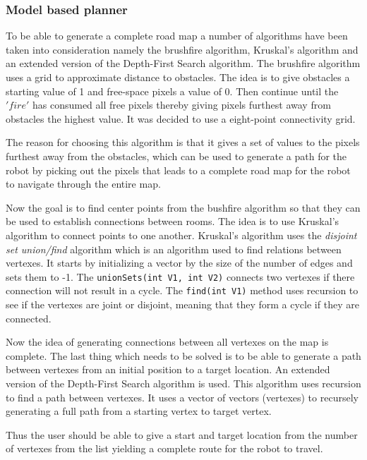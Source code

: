 \documentclass[../Head/Main.tex]{subfiles}
\begin{document}
\subsubsection{Model based planner}

To be able to generate a complete road map a number of algorithms have been taken into consideration namely the brushfire algorithm, Kruskal's algorithm and an extended version of the Depth-First Search algorithm. 
The brushfire algorithm uses a grid to approximate distance to obstacles. The idea is to give obstacles a starting value of 1 and free-space pixels a value of 0. Then continue until the $'fire'$ has consumed all free pixels thereby giving pixels furthest away from obstacles the highest value. It was decided to use a eight-point connectivity grid. \par
{}


The reason for choosing this algorithm is that it gives a set of values to the pixels furthest away from the obstacles, which can be used to generate a path for the robot by picking out the pixels that leads to a complete road map for the robot to navigate through the entire map. \par
{}
Now the goal is to find center points from the bushfire algorithm so that they can be used to establish connections between rooms. The idea is to use Kruskal's algorithm to connect points to one another.  Kruskal's algorithm uses the \textit{disjoint set union/find} algorithm which is an algorithm used to find relations between vertexes. It starts by initializing a vector by the size of the number of edges and sets them to -1. The \texttt{unionSets(int V1, int V2)} connects two vertexes if there connection will not result in a cycle.  The \texttt{find(int V1)} method uses recursion to see if the vertexes are joint or disjoint, meaning that they form a cycle if they are connected.


Now the idea of generating connections between all vertexes on the map is complete. The last thing which needs to be solved is to be able to generate a path between vertexes from an initial position to a target location. An extended version of the Depth-First Search algorithm is used. This algorithm uses recursion to find a path between vertexes. It uses a vector of vectors (vertexes) to recursely generating a full path from a starting vertex to target vertex. 

Thus the user should be able to give a start and target location from the number of vertexes from the list yielding a complete route for the robot to travel.
\end{document}
